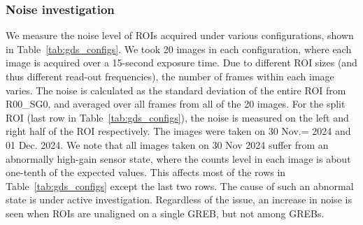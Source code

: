 \subsubsection{Noise investigation}
We measure the noise level of ROIs acquired under various configurations, shown in Table~\ref{tab:gds_configs}. We took 20 images in each configuration, where each image is acquired over a 15-second exposure time. Due to different ROI sizes (and thus different read-out frequencies), the number of frames within each image varies.  The noise is calculated as the standard deviation of the entire ROI from R00\_SG0, and averaged over all frames from all of the 20 images. For the split ROI (last row in Table~\ref{tab:gds_configs}), the noise is measured on the left and right half of the ROI respectively. The images were taken on 30 Nov.= 2024 and 01 Dec. 2024. We note that all images taken on 30 Nov 2024 suffer from an abnormally high-gain sensor state, where the counts level in each image is about one-tenth of the expected values. This affects most of the rows in Table~\ref{tab:gds_configs} except the last two rows. The cause of such an abnormal state is under active investigation. Regardless of the issue, an increase in noise is seen when ROIs are unaligned on a single GREB, but not among GREBs.

